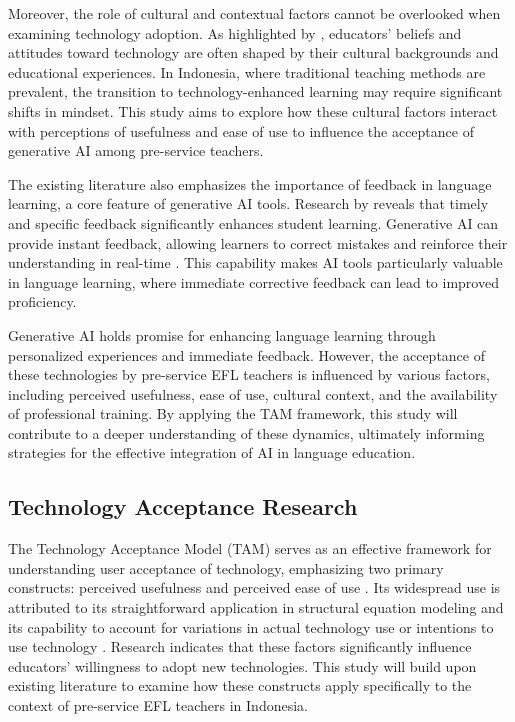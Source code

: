 \documentclass[english]{textolivre}
\begin{document}
Moreover, the role of cultural and contextual factors cannot be overlooked when examining technology adoption. As highlighted by \textcite{Aldosari2020FutureHigherEducationAI}, educators’ beliefs and attitudes toward technology are often shaped by their cultural backgrounds and educational experiences. In Indonesia, where traditional teaching methods are prevalent, the transition to technology-enhanced learning may require significant shifts in mindset. This study aims to explore how these cultural factors interact with perceptions of usefulness and ease of use to influence the acceptance of generative AI among pre-service teachers.

The existing literature also emphasizes the importance of feedback in language learning, a core feature of generative AI tools. Research by \textcite{AliEtAl2024AIEducationalSettings} reveals that timely and specific feedback significantly enhances student learning. Generative AI can provide instant feedback, allowing learners to correct mistakes and reinforce their understanding in real-time \cite{ZhangCao2022AIEnglishTeaching}. This capability makes AI tools particularly valuable in language learning, where immediate corrective feedback can lead to improved proficiency.

Generative AI holds promise for enhancing language learning through personalized experiences and immediate feedback. However, the acceptance of these technologies by pre-service EFL teachers is influenced by various factors, including perceived usefulness, ease of use, cultural context, and the availability of professional training. By applying the TAM framework, this study will contribute to a deeper understanding of these dynamics, ultimately informing strategies for the effective integration of AI in language education.

\subsection{Technology Acceptance Research}\label{sec-conduta}
The Technology Acceptance Model (TAM) serves as an effective framework for understanding user acceptance of technology, emphasizing two primary constructs: perceived usefulness and perceived ease of use \cite{Davis1989TAM}. Its widespread use is attributed to its straightforward application in structural equation modeling and its capability to account for variations in actual technology use or intentions to use technology \cite{SulistiyoEtAl2022TAMICT}. Research indicates that these factors significantly influence educators’ willingness to adopt new technologies. This study will build upon existing literature to examine how these constructs apply specifically to the context of pre-service EFL teachers in Indonesia.
\end{document}
